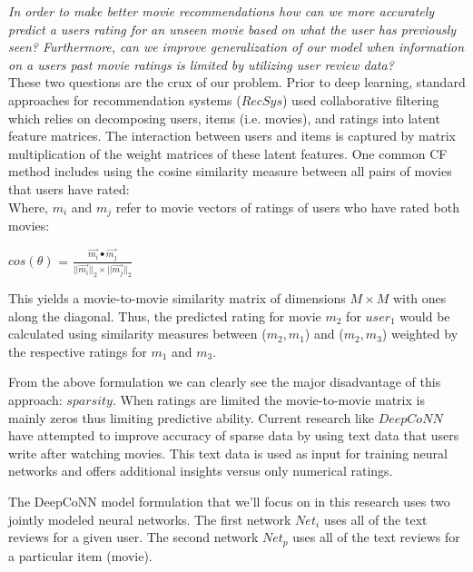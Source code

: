 \documentclass[10pt,twocolumn,letterpaper]{article}
\begin{document}
\textit{In order to make better movie recommendations how can we more accurately predict a users rating for an unseen movie based on what the user has previously seen? Furthermore, can we improve generalization of our model when information on a users past movie ratings is limited by utilizing user review data?}\\

These two questions are the crux of our problem. Prior to deep learning, standard approaches for recommendation systems ($RecSys$) used collaborative filtering which relies on decomposing users, items (i.e. movies), and ratings into latent feature matrices. The interaction between users and items is captured by matrix multiplication of the weight matrices of these latent features. One common CF method includes using the cosine similarity measure between all pairs of movies that users have rated:\\

Where,
$m_{i}$ and $m_{j}$ refer to movie vectors of ratings of users who have rated both movies:

\begin{center}
\textbf{$cos(\theta)$} =
$\frac{\vec{m_{i}} \bullet \vec{m_{j}}}{||\vec{m_{i}}||_2 \times ||\vec{m_{j}}||_2}$
\end{center}

This yields a movie-to-movie similarity matrix of dimensions $M \times M$ with ones along the diagonal. Thus, the predicted rating for movie $m_{2}$ for $user_1$ would be calculated using similarity measures between ($m_2,m_1$) and ($m_2,m_3$) weighted by the respective ratings for $m_1$ and $m_3$. 

From the above formulation we can clearly see the major disadvantage of this approach: $sparsity$. When ratings are limited the movie-to-movie matrix is mainly zeros thus limiting predictive ability. Current research like $DeepCoNN$ have attempted to improve accuracy of sparse data by using text data that users write after watching movies. This text data is used as input for training neural networks and offers additional insights versus only numerical ratings.

The DeepCoNN model formulation that we'll focus on in this research uses two jointly modeled neural networks. The first network $Net_{i}$ uses all of the text reviews for a given user. The second network $Net_{p}$ uses all of the text reviews for a particular item (movie).
\end{document}
